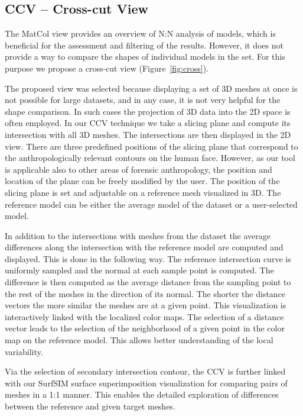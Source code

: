 \documentclass[final,5p,times]{elsarticle}
\begin{document}
\subsection{CCV -- Cross-cut View}
The MatCol view provides an overview of N:N analysis of models, which is beneficial for the assessment and filtering of the results. 
However, it does not provide a way to compare the shapes of individual models in the set.
For this purpose we propose a cross-cut view (Figure~\ref{fig:cross}).

The proposed view was selected because displaying a set of 3D meshes at once is not possible for large datasets, and in any case, it is not very helpful for the shape comparison. 
In such cases the projection of 3D data into the 2D space is often employed.
In our CCV technique we take a slicing plane and compute its intersection with all 3D meshes.
The intersections are then displayed in the 2D view.
There are three predefined positions of the slicing plane that correspond to the anthropologically relevant contours on the human face. 
However, as our tool is applicable also to other areas of forensic anthropology, the position and location of the plane can be freely modified by the user.
The position of the slicing plane is set and adjustable on a reference mesh visualized in 3D.
The reference model can be either the average model of the dataset or a user-selected model.

In addition to the intersections with meshes from the dataset the average differences along the intersection with the reference model are computed and displayed.
This is done in the following way.
The reference intersection curve is uniformly sampled and the normal at each sample point is computed.
The difference is then computed as the average distance from the sampling point to the rest of the meshes in the direction of its normal.
The shorter the distance vectors the more similar the meshes are at a given point.
This visualization is interactively linked with the localized color maps.
The selection of a distance vector leads to the selection of the neighborhood of a given point in the color map on the reference model.
This allows better understanding of the local variability.

Via the selection of secondary intersection contour, the CCV is further linked with our SurfSIM surface superimposition visualization for comparing pairs of meshes in a 1:1 manner. 
This enables the detailed exploration of differences between the reference and given target meshes. 
\end{document}
